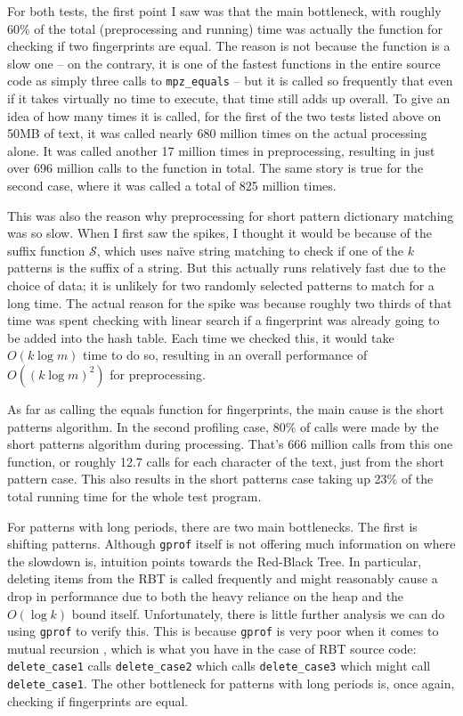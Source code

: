 \documentclass[ %
                    author={Dominic Joseph Moylett},
                    degree={MEng},
                     title={Dictionary Matching with Fingerprints},
                  subtitle={An Empirical Analysis},
                      type={research},
                      year={2015} ]{dissertation}
\begin{document}
For both tests, the first point I saw was that the main bottleneck, with roughly 60\% of the total (preprocessing and running) time was actually the function for checking if two fingerprints are equal. The reason is not because the function is a slow one -- on the contrary, it is one of the fastest functions in the entire source code as simply three calls to \texttt{mpz\_equals} -- but it is called so frequently that even if it takes virtually no time to execute, that time still adds up overall. To give an idea of how many times it is called, for the first of the two tests listed above on 50MB of text, it was called nearly 680 million times on the actual processing alone. It was called another 17 million times in preprocessing, resulting in just over 696 million calls to the function in total. The same story is true for the second case, where it was called a total of 825 million times.

This was also the reason why preprocessing for short pattern dictionary matching was so slow. When I first saw the spikes, I thought it would be because of the suffix function $\mathcal{S}$, which uses na\"{i}ve string matching to check if one of the $k$ patterns is the suffix of a string. But this actually runs relatively fast due to the choice of data; it is unlikely for two randomly selected patterns to match for a long time. The actual reason for the spike was because roughly two thirds of that time was spent checking with linear search if a fingerprint was already going to be added into the hash table. Each time we checked this, it would take $O(k\log m)$ time to do so, resulting in an overall performance of $O((k\log m)^2)$ for preprocessing.

As far as calling the equals function for fingerprints, the main cause is the short patterns algorithm. In the second profiling case, 80\% of calls were made by the short patterns algorithm during processing. That's 666 million calls from this one function, or roughly 12.7 calls for each character of the text, just from the short pattern case. This also results in the short patterns case taking up 23\% of the total running time for the whole test program.

For patterns with long periods, there are two main bottlenecks. The first is shifting patterns. Although \texttt{gprof} itself is not offering much information on where the slowdown is, intuition points towards the Red-Black Tree. In particular, deleting items from the RBT is called frequently and might reasonably cause a drop in performance due to both the heavy reliance on the heap and the $O(\log k)$ bound itself. Unfortunately, there is little further analysis we can do using \texttt{gprof} to verify this. This is because \texttt{gprof} is very poor when it comes to mutual recursion \cite{SPE:SPE562}, which is what you have in the case of RBT source code: \texttt{delete\_case1} calls \texttt{delete\_case2} which calls \texttt{delete\_case3} which might call \texttt{delete\_case1}. The other bottleneck for patterns with long periods is, once again, checking if fingerprints are equal.
\end{document}
